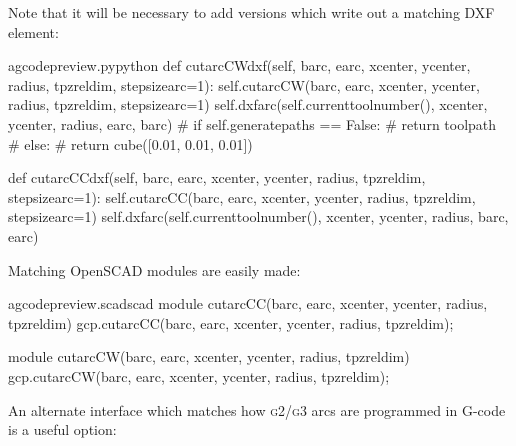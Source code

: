 \documentclass{ltxdoc}
\begin{document}
Note that it will be necessary to add versions which write out a matching DXF element:

\lstset{firstnumber=\thegcpy}
\begin{writecode}{a}{gcodepreview.py}{python}
    def cutarcCWdxf(self, barc, earc, xcenter, ycenter, radius, tpzreldim, stepsizearc=1):
        self.cutarcCW(barc, earc, xcenter, ycenter, radius, tpzreldim, stepsizearc=1)
        self.dxfarc(self.currenttoolnumber(), xcenter, ycenter, radius, earc, barc)
#        if self.generatepaths == False:
#        return toolpath
#        else:
#            return cube([0.01, 0.01, 0.01])

    def cutarcCCdxf(self, barc, earc, xcenter, ycenter, radius, tpzreldim, stepsizearc=1):
        self.cutarcCC(barc, earc, xcenter, ycenter, radius, tpzreldim, stepsizearc=1)
        self.dxfarc(self.currenttoolnumber(), xcenter, ycenter, radius, barc, earc)

\end{writecode}
\addtocounter{gcpy}{12}

Matching OpenSCAD modules are easily made:

\lstset{firstnumber=\thegcpscad}
\begin{writecode}{a}{gcodepreview.scad}{scad}
module cutarcCC(barc, earc, xcenter, ycenter, radius, tpzreldim){
    gcp.cutarcCC(barc, earc, xcenter, ycenter, radius, tpzreldim);
}

module cutarcCW(barc, earc, xcenter, ycenter, radius, tpzreldim){
    gcp.cutarcCW(barc, earc, xcenter, ycenter, radius, tpzreldim);
}

\end{writecode}
\addtocounter{gcpscad}{8}

An alternate interface which matches how \textsc{g2/g3} arcs are programmed in G-code is a useful option:
\end{document}

